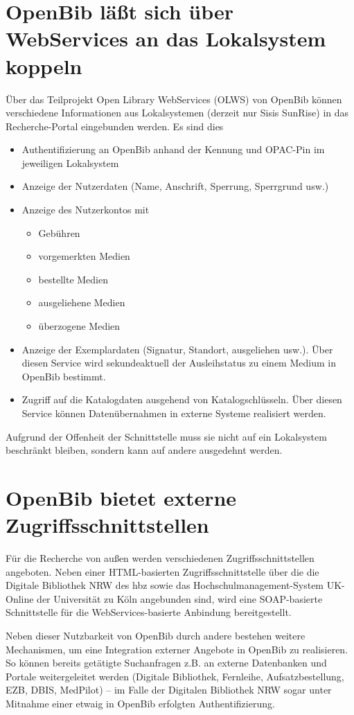 \documentclass[11pt, twoside, a4paper, BCOR8mm, DIV12, bibtotoc,idxtotoc]{scrbook}
\begin{document}
\section{OpenBib läßt sich über WebServices an das Lokalsystem koppeln}
Über das Teilprojekt Open Library WebServices (OLWS) von OpenBib
können verschiedene Informationen aus Lokalsystemen (derzeit nur
Sisis SunRise) in das Recherche-Portal eingebunden werden. Es sind
dies
\begin{itemize}
\item Authentifizierung an OpenBib anhand der Kennung und OPAC-Pin im
  jeweiligen Lokalsystem
\item Anzeige der Nutzerdaten (Name, Anschrift, Sperrung, Sperrgrund usw.)
\item Anzeige des Nutzerkontos mit
  \begin{itemize}
  \item Gebühren
  \item vorgemerkten Medien
  \item bestellte Medien
  \item ausgeliehene Medien
  \item überzogene Medien
  \end{itemize}
\item Anzeige der Exemplardaten (Signatur, Standort, ausgeliehen
  usw.). Über diesen Service wird sekundeaktuell der Ausleihstatus zu
  einem Medium in OpenBib bestimmt.
\item Zugriff auf die Katalogdaten ausgehend von
  Katalogschlüsseln. Über diesen Service können Datenübernahmen in
  externe Systeme realisiert werden.
\end{itemize}

Aufgrund der Offenheit der Schnittstelle muss sie nicht auf ein
Lokalsystem beschränkt bleiben, sondern kann auf andere ausgedehnt
werden.
\section{OpenBib bietet externe Zugriffsschnittstellen}
Für die Recherche von außen werden verschiedenen
Zugriffsschnittstellen angeboten. Neben einer HTML-basierten
Zugriffsschnittstelle über die die Digitale Bibliothek NRW des hbz
sowie das Hochschulmanagement-System UK-Online der Universität zu
Köln angebunden sind, wird eine SOAP-basierte Schnittstelle für die
WebServices-basierte Anbindung bereitgestellt.

Neben dieser Nutzbarkeit von OpenBib durch andere bestehen weitere
Mechanismen, um eine Integration externer Angebote in OpenBib zu
realisieren. So können bereits getätigte Suchanfragen z.B. an
externe Datenbanken und Portale weitergeleitet werden (Digitale
Bibliothek, Fernleihe, Aufsatzbestellung, EZB, DBIS, MedPilot) -- im
Falle der Digitalen Bibliothek NRW sogar unter Mitnahme einer etwaig
in OpenBib erfolgten Authentifizierung.
\end{document}
